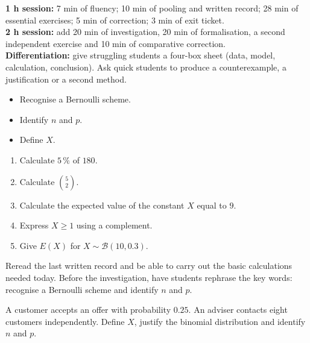 \ifprof
\begin{methode}
\textbf{1 h session:} 7 min of fluency; 10 min of pooling and written record; 28 min of essential exercises; 5 min of correction; 3 min of exit ticket.\\
\textbf{2 h session:} add 20 min of investigation, 20 min of formalisation, a second independent exercise and 10 min of comparative correction.\\
\textbf{Differentiation:} give struggling students a four-box sheet (data, model, calculation, conclusion). Ask quick students to produce a counterexample, a justification or a second method.
\end{methode}
\fi
{}
\begin{objectifs}\begin{itemize}\item Recognise a Bernoulli scheme.\item Identify $n$ and $p$.\item Define $X$.\end{itemize}\end{objectifs}
\begin{automatismes}\begin{enumerate}\item Calculate $5\,\%$ of $180$. \item Calculate $\binom52$. \item Calculate the expected value of the constant $X$ equal to $9$. \item Express $X\geq1$ using a complement. \item Give $E(X)$ for $X\sim\mathcal B(10,0.3)$. \end{enumerate}\end{automatismes}
\begin{prerequis}Reread the last written record and be able to carry out the basic calculations needed today. Before the investigation, have students rephrase the key words: recognise a Bernoulli scheme and identify $n$ and $p$.\end{prerequis}

\begin{activite}
A customer accepts an offer with probability $0.25$. An adviser contacts eight customers independently. Define $X$, justify the binomial distribution and identify $n$ and $p$.

\end{activite}

